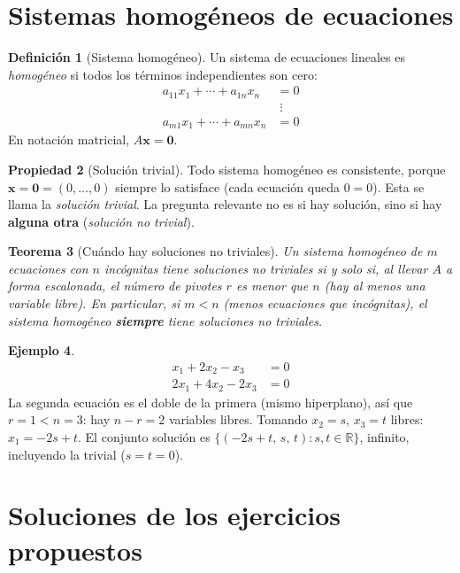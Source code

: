 \documentclass[11pt,letterpaper]{article}
\theoremstyle{definition}
\newtheorem{definicion}{Definición}[section]
\newtheorem{ejemplo}[definicion]{Ejemplo}
\newtheorem{propiedad}[definicion]{Propiedad}
\theoremstyle{plain}
\newtheorem{teorema}[definicion]{Teorema}
\newcommand{\R}{\mathbb{R}}
\newcommand{\vv}[1]{\mathbf{#1}}
\begin{document}
\section{Sistemas homogéneos de ecuaciones}

\begin{definicion}[Sistema homogéneo]
Un sistema de ecuaciones lineales es \emph{homogéneo} si todos los términos independientes son
cero:
\[
\begin{aligned}
  a_{11}x_1 + \cdots + a_{1n}x_n &= 0 \\
  &\;\vdots \\
  a_{m1}x_1 + \cdots + a_{mn}x_n &= 0
\end{aligned}
\]
En notación matricial, $A\vv{x}=\vv{0}$.
\end{definicion}

\begin{propiedad}[Solución trivial]
Todo sistema homogéneo es consistente, porque $\vv{x}=\vv{0}=(0,\dots,0)$ siempre lo satisface
(cada ecuación queda $0=0$). Esta se llama la \emph{solución trivial}. La pregunta relevante no es
si hay solución, sino si hay \textbf{alguna otra} (\emph{solución no trivial}).
\end{propiedad}

\begin{teorema}[Cuándo hay soluciones no triviales]
Un sistema homogéneo de $m$ ecuaciones con $n$ incógnitas tiene soluciones no triviales si y solo
si, al llevar $A$ a forma escalonada, el número de pivotes $r$ es menor que $n$ (hay al menos una
variable libre). En particular, si $m<n$ (menos ecuaciones que incógnitas), el sistema homogéneo
\textbf{siempre} tiene soluciones no triviales.
\end{teorema}

\begin{ejemplo}
\[
\begin{aligned}
  x_1 + 2x_2 - x_3 &= 0 \\
  2x_1 + 4x_2 - 2x_3 &= 0
\end{aligned}
\]
La segunda ecuación es el doble de la primera (mismo hiperplano), así que $r=1 < n=3$: hay
$n-r=2$ variables libres. Tomando $x_2=s$, $x_3=t$ libres: $x_1=-2s+t$. El conjunto solución es
$\{(-2s+t,\,s,\,t) : s,t\in\R\}$, infinito, incluyendo la trivial ($s=t=0$).
\end{ejemplo}

\section{Soluciones de los ejercicios propuestos}
\end{document}
